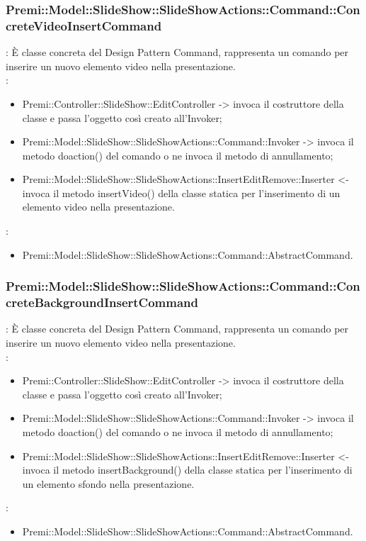 {                \subsubsection{Premi::Model::SlideShow::SlideShowActions::Command::ConcreteVideoInsertCommand}{
				\textbf{\tipo}: È classe concreta del Design Pattern Command, rappresenta un comando per inserire un nuovo elemento video nella presentazione.\\	
				\textbf{\relaz}: 
				\begin{itemize}
					\item Premi::Controller::SlideShow::EditController -> invoca il costruttore della classe e passa l’oggetto così creato all’Invoker;
					\item Premi::Model::SlideShow::SlideShowActions::Command::Invoker -> invoca il metodo doaction() del comando o ne invoca il metodo di annullamento;
                    \item Premi::Model::SlideShow::SlideShowActions::InsertEditRemove::Inserter <- invoca il metodo insertVideo() della classe statica per l’inserimento di un elemento video nella presentazione.
				\end{itemize}	
                \textbf{\base}: 
                    \begin{itemize}
                    \item Premi::Model::SlideShow::SlideShowActions::Command::AbstractCommand.
                    \end{itemize}
                    }
                \subsubsection{Premi::Model::SlideShow::SlideShowActions::Command::ConcreteBackgroundInsertCommand}{
				\textbf{\tipo}: È classe concreta del Design Pattern Command, rappresenta un comando per inserire un nuovo elemento video nella presentazione.\\	
				\textbf{\relaz}: 
				\begin{itemize}
					\item Premi::Controller::SlideShow::EditController -> invoca il costruttore della classe e passa l’oggetto così creato all’Invoker;
					\item Premi::Model::SlideShow::SlideShowActions::Command::Invoker -> invoca il metodo doaction() del comando o ne invoca il metodo di annullamento;
                    \item Premi::Model::SlideShow::SlideShowActions::InsertEditRemove::Inserter <- invoca il metodo insertBackground() della classe statica per l’inserimento di un elemento sfondo nella presentazione.
				\end{itemize}
                \textbf{\base}: 
                    \begin{itemize}
                    \item Premi::Model::SlideShow::SlideShowActions::Command::AbstractCommand.
                    \end{itemize}
                    }        
}
